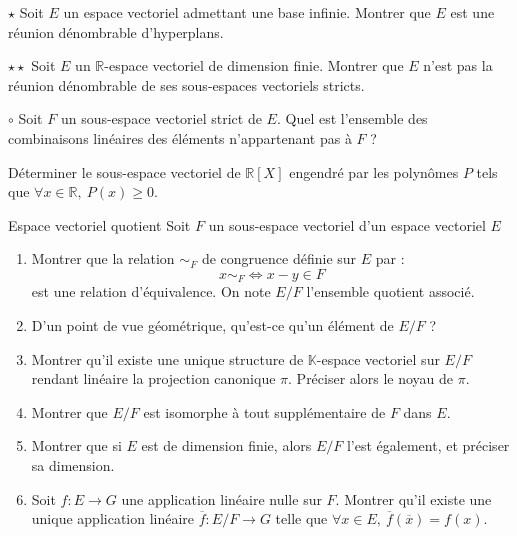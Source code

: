 \documentclass[french,a4paper]{article}
\newcommand{\R}{\mathbb{R}}
\newcommand{\K}{\mathbb{K}}
\theoremstyle{plain}
\theoremstyle{definition}
\theoremstyle{remark}
\begin{document}
\begin{ex}[Moulin.EV.02]{$\star$}
	Soit $E$ un espace vectoriel admettant une base infinie. Montrer que $E$ est une réunion dénombrable d'hyperplans.
\end{ex}

\begin{ex}[Moulin.EV.03]{$\star\star$}
	Soit $E$ un $\R$-espace vectoriel de dimension finie. Montrer que $E$ n'est pas la réunion dénombrable de ses sous-espaces vectoriels stricts.
\end{ex}

\begin{ex}[Moulin.EV.04]{$\circ$}
	Soit $F$ un sous-espace vectoriel strict de $E$. Quel est l'ensemble des combinaisons linéaires des éléments n'appartenant pas à $F$ ?
\end{ex}

\begin{ex}[Moulin.EV.05]{}
	Déterminer le sous-espace vectoriel de $\R[X]$ engendré par les polynômes $P$ tels que $\forall x\in\R,\ P(x)\geqslant 0$.
\end{ex}

\begin{ex}[Moulin.EV.06]{Espace vectoriel quotient}
	Soit $F$ un sous-espace vectoriel d'un espace vectoriel $E$
	\begin{enumerate}
		\item Montrer que la relation $\sim_F$ de congruence définie sur $E$ par : $$x\sim_F\iff x-y\in F$$ est une relation d'équivalence. On note $E/F$ l'ensemble quotient associé.
		\item D'un point de vue géométrique, qu'est-ce qu'un élément de $E/F$ ?
		\item Montrer qu'il existe une unique structure de $\K$-espace vectoriel sur $E/F$ rendant linéaire la projection canonique $\pi$. Préciser alors le noyau de $\pi$.
		\item Montrer que $E/F$ est isomorphe à tout supplémentaire de $F$ dans $E$.
		\item Montrer que si $E$ est de dimension finie, alors $E/F$ l'est également, et préciser sa dimension.
		\item Soit $f:E\to G$ une application linéaire nulle sur $F$. Montrer qu'il existe une unique application linéaire $\overline{f}:E/F\to G$ telle que $\forall x\in E,\ \overline{f}(\overline{x})=f(x)$.
	\end{enumerate}
\end{ex}
\end{document}
